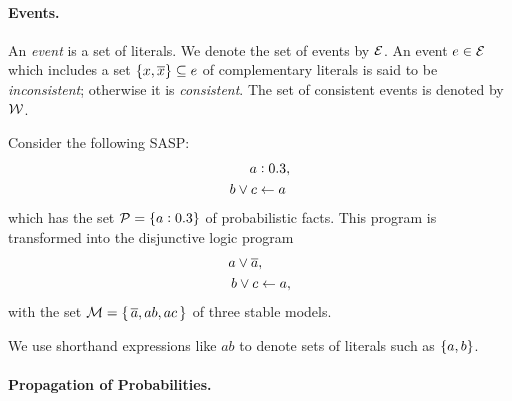 \documentclass[x11names]{tlp}
\begin{document}
\paragraph{Events.}

An \emph{event} is a set of literals. We denote the set of events by
$\EVENTSset$. An event $e \in \EVENTSset$ which includes a set $\set{x,
		\ensuremath{\overline{x}}} \subseteq e$ of complementary literals is said to be
\textit{inconsistent}; otherwise it is \textit{consistent}. The set of
consistent events is denoted by $\CONSISTset$.

\begin{example}
	\label{ex:fruitful}\em

	Consider the following \acl{SASP}:
	\begin{equation}\label{eq:fruitful}
		\begin{split}
			\probfact{a & }{0.3},   %
			\\
			b \vee c    & \clause a
		\end{split}
	\end{equation}
	which has the set $\PROBFset = \{ a:0.3 \}$ of probabilistic
	facts.  This program is transformed into the disjunctive logic
	program
	\begin{equation}\label{eq:derived.fruitful}
		\begin{split}
			a \vee \co{a} & ,          %
			\\
			b \vee c      & \clause a,
		\end{split}
	\end{equation}
	with the set
	$ \MODELset = \{\, \co{a}, ab, ac\, \} $
	of three stable models.
\end{example}

We use shorthand expressions like $ab$ to denote sets of literals such as
$\set{a, b}$.

\paragraph{Propagation of Probabilities.}
\end{document}
